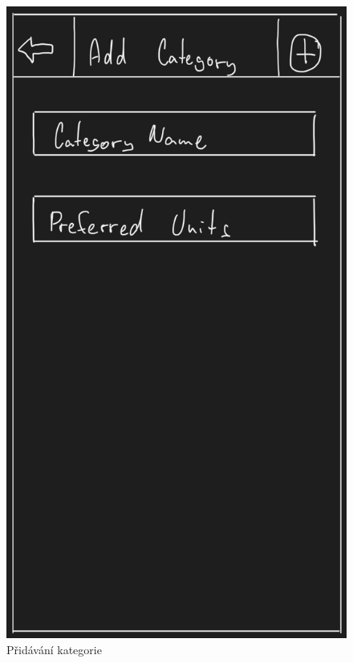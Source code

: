 \documentclass[12pt, titlepage]{article}
\begin{document}
\begin{figure}[ht]
	\centering
	\includegraphics[scale=0.43]{add_category}
	\caption{Přidávání kategorie}
	\label{fig:add_category}
\end{figure}
\end{document}

